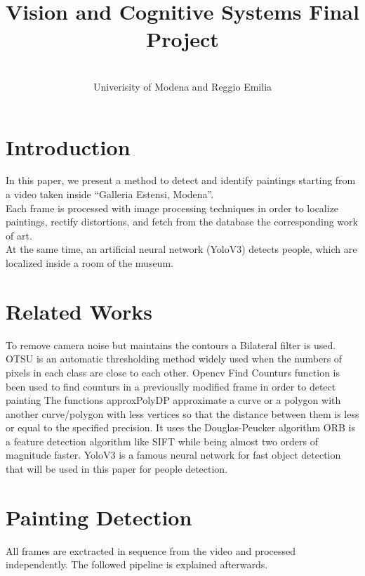 \documentclass[conference]{IEEEtran}
\begin{document}
\title{Vision and Cognitive Systems Final Project}
\author{
\and
{}
\\
\large{Univerisity of Modena and Reggio Emilia}
\and
{}
}
\maketitle


\section{Introduction}
In this paper, we present a method to detect and identify paintings starting from a video taken inside “Galleria Estensi, Modena”.\\
Each frame is processed with image processing techniques in order to localize paintings, rectify distortions, and fetch from the database the corresponding work of art.\\
At the same time, an artificial neural network (YoloV3) detects people, which are localized inside a room of the museum.\\

\section{Related Works}
To remove camera noise but maintains the contours a  Bilateral filter\cite{b1} is used.
OTSU\cite{b2} is an automatic thresholding method widely used when the numbers of pixels in each class are close to each other.
Opencv Find Counturs\cite{b3} function is been used to find counturs in a previouslly modified frame in order to detect painting
The functions approxPolyDP\cite{b4} approximate a curve or a polygon with another curve/polygon with less vertices so that the distance between them is less or equal to the specified precision. It uses the Douglas-Peucker algorithm  
ORB\cite{b5} is a feature detection algorithm like SIFT while being almost two orders of magnitude faster.
YoloV3 \cite{b5}  is a famous neural network for fast object detection that will be used in this paper for people detection.\\

\section{Painting Detection}
All frames are exctracted in sequence from the video and processed independently. The followed pipeline is explained afterwards.
\end{document}
